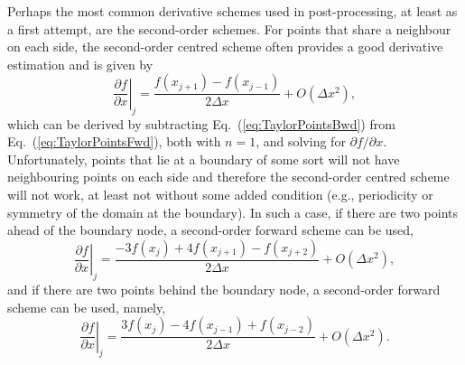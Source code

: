 \documentclass[10pt, twoside]{book}
\begin{document}
				Perhaps the most common derivative schemes used in post-processing, at least as a first attempt, are the second-order schemes. For points that share a neighbour on each side, the second-order centred scheme often provides a good derivative estimation and is given by
				\begin{equation}
				\label{eq:SecondOrderCentreD1}
					\left.\frac{\partial f}{\partial x}\right|_j = \frac{f\left(x_{j+1}\right) - f\left(x_{j-1}\right)}{2{\Delta}x} + O\left({\Delta}x^2\right),
				\end{equation}
				which can be derived by subtracting Eq.~(\ref{eq:TaylorPointsBwd}) from Eq.~(\ref{eq:TaylorPointsFwd}), both with $n = 1$, and solving for $\partial f/\partial x$. Unfortunately, points that lie at a boundary of some sort will not have neighbouring points on each side and therefore the second-order centred scheme will not work, at least not without some added condition (e.g., periodicity or symmetry of the domain at the boundary). In such a case, if there are two points ahead of the boundary node, a second-order forward scheme can be used,
				\begin{equation}
				\label{eq:SecondOrderFwdD1}
					\left.\frac{\partial f}{\partial x}\right|_j = \frac{-3f\left(x_{j}\right) + 4f\left(x_{j+1}\right) - f\left(x_{j+2}\right)}{2{\Delta}x} + O\left({\Delta}x^2\right),
				\end{equation}
				and if there are two points behind the boundary node, a second-order forward scheme can be used, namely,
				\begin{equation}
				\label{eq:SecondOrderBwdD1}
					\left.\frac{\partial f}{\partial x}\right|_j = \frac{3f\left(x_{j}\right) - 4f\left(x_{j-1}\right) + f\left(x_{j-2}\right)}{2{\Delta}x} + O\left({\Delta}x^2\right).
				\end{equation}
				
\end{document}
